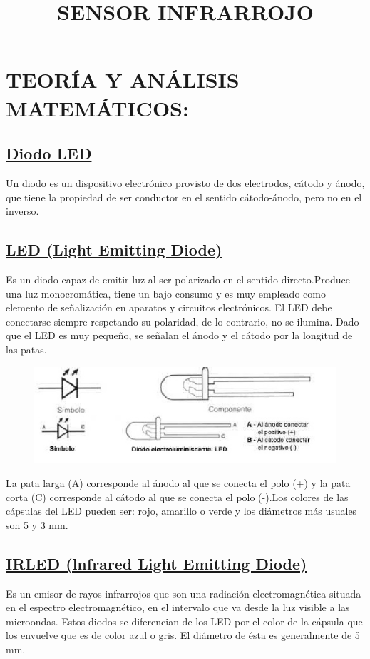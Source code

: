 \documentclass[a4paper,11pt]{article}
\begin{document}
\section{TEORÍA Y ANÁLISIS MATEMÁTICOS:}

\title{SENSOR INFRARROJO}
\subsection{\underline{Diodo LED}}
Un diodo es un dispositivo electrónico provisto de dos electrodos, cátodo y ánodo, que tiene la propiedad de ser conductor en el sentido cátodo-ánodo, pero no en el inverso.

\subsection{\underline{LED (Light Emitting Diode)}}
Es un diodo capaz de emitir luz al ser polarizado en el sentido directo.Produce una luz monocromática, tiene un bajo consumo y es muy empleado como elemento de señalización en aparatos y circuitos electrónicos. El LED debe conectarse siempre respetando su polaridad, de lo contrario, no se ilumina. Dado que el LED es muy pequeño, se señalan el ánodo y el cátodo por la longitud de las patas.
	\begin{figure}[h]
	\centering
	\includegraphics{./1}
	\end{figure}

La pata larga (A) corresponde al ánodo al que se conecta el polo (+) y la pata corta (C) corresponde al cátodo al que se conecta el polo (-).Los colores de las cápsulas del LED pueden ser: rojo, amarillo o verde y los diámetros más usuales son 5 y 3 mm.

\subsection{\underline{IRLED (lnfrared Light Emitting Diode)}}
Es un emisor de rayos infrarrojos que son una radiación electromagnética situada en el espectro electromagnético, en el intervalo que va desde la luz visible a las microondas. Estos diodos se diferencian de los LED por el color de la cápsula que los envuelve que es de color azul o gris. El diámetro de ésta es generalmente de 5 mm.
\end{document}
